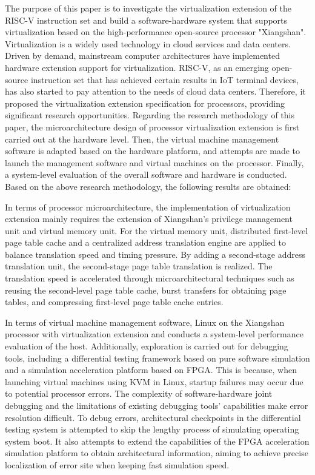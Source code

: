 \begin{eabstract}
The purpose of this paper is to
investigate the virtualization extension of the RISC-V instruction set
and build a software-hardware system that supports virtualization
based on the high-performance open-source processor "Xiangshan".
Virtualization is a widely used technology in cloud services and data centers.
Driven by demand, mainstream computer architectures have implemented hardware extension support for virtualization.
RISC-V, as an emerging open-source instruction set that has achieved certain results in IoT terminal devices,
has also started to pay attention to the needs of cloud data centers.
Therefore, it proposed the virtualization extension specification for processors,
providing significant research opportunities.
Regarding the research methodology of this paper,
the microarchitecture design of processor virtualization extension is first carried out at the hardware level.
Then, the virtual machine management software is adapted based on the hardware platform,
and attempts are made to launch the management software and virtual machines on the processor.
Finally, a system-level evaluation of the overall software and hardware is conducted.
Based on the above research methodology, the following results are obtained:

In terms of processor microarchitecture,
the implementation of virtualization extension mainly requires the extension of Xiangshan's privilege management unit and virtual memory unit.
For the virtual memory unit, distributed first-level page table cache and a centralized address translation engine
are applied to balance translation speed and timing pressure.
By adding a second-stage address translation unit, the second-stage page table translation is realized.
The translation speed is accelerated through microarchitectural techniques such as reusing the second-level page table cache,
burst transfers for obtaining page tables,
and compressing first-level page table cache entries.

In terms of virtual machine management software,
Linux on the Xiangshan processor with virtualization extension
and conducts a system-level performance evaluation of the host.
Additionally, exploration is carried out for debugging tools,
including a differential testing framework based on pure software simulation and a simulation acceleration platform based on FPGA.
This is because, when launching virtual machines using KVM in Linux, startup failures may occur due to potential processor errors.
The complexity of software-hardware joint debugging
and the limitations of existing debugging tools' capabilities
make error resolution difficult.
To debug errors, architectural checkpoints in the differential testing system is attempted to skip the lengthy process of simulating operating system boot.
It also attempts to extend the capabilities of the FPGA acceleration simulation platform to obtain architectural information,
aiming to achieve precise localization of error site when keeping fast simulation speed.
  

\end{eabstract}
